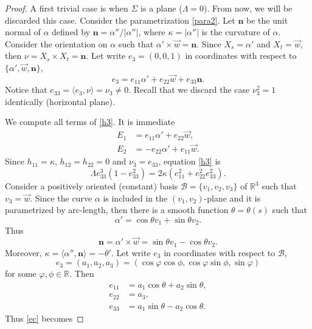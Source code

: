 \documentclass[12pt,a4paper,reqno]{amsart}
\def\r{\mathbb R}
\def\n{\mathbf n}
\begin{document}
\begin{proof}
A first trivial case is when $\Sigma$ is a plane ($\Lambda=0$). From now, we will be discarded this case.   Consider the parametrization \eqref{para2}. Let $\n$ be the unit normal of $\alpha$ defined by $\n=\alpha''/|\alpha''|$, where $\kappa=|\alpha''|$ is the curvature of $\alpha$. Consider the orientation on  $\alpha$ such that $\alpha'\times \vec{w}=\n$. Since $X_s=\alpha'$ and $X_t=\vec{w}$, then $\nu=X_s\times X_t=\n$. Let write $e_3=(0,0,1)$ in coordinates with respect to $\{\alpha',\vec{w},\n\}$, 
$$e_3=e_{11}\alpha'+e_{22} \vec{w}+e_{33}\n.$$
Notice that $e_{33}=\langle e_3,\nu\rangle=\nu_3\not=0$.  
Recall that we discard the case $\nu_3^2= 1$ identically (horizontal plane). 

We compute all terms of \eqref{h3}. It is immediate  
 \begin{equation*}
\begin{split}
E_1&=e_{11}\alpha'+e_{22}\vec{w},\\
E_2&=-e_{22}\alpha'+e_{11}\vec{w}.
\end{split}
\end{equation*}
Since $h_{11}=\kappa$, $h_{12}=h_{22}=0$ and $\nu_3=e_{33}$, equation \eqref{h3} is 
\begin{equation}\label{ec}
\Lambda e_{33}^3(1-e_{33}^2)=2\kappa (e_{11}^2+e_{22}^2e_{33}^2).
\end{equation}
Consider a positively oriented (constant) basis $\mathcal{B}=\{v_1,v_2,v_3\}$ of $\r^3$ such that $v_3=\vec{w}$. Since the curve $\alpha$ is included in the $(v_1,v_2)$-plane and it is parametrized by arc-length, then there is a smooth function $\theta=\theta(s)$ such that 
$$\alpha'=\cos\theta v_1+\sin\theta v_2.$$
Thus 
$$\n=\alpha'\times \vec{w}=\sin\theta v_1-\cos\theta v_2.$$
Moreover, $\kappa=\langle\alpha'',\n\rangle=-\theta'$. Let write $e_3$ in coordinates with respect to $\mathcal{B}$, 
\begin{equation}\label{cij}
e_3=(a_1,a_2,a_3)=(\cos\varphi\cos\phi,\cos\varphi\sin\phi,\sin\varphi)
\end{equation}
for some $\varphi,\phi\in\r$.  Then 
\begin{equation*}
\begin{split}
e_{11}&=a_1\cos\theta+a_2\sin\theta,\\
 e_{22}&=a_3,\\
 e_{33}&=a_1\sin\theta-a_2\cos\theta.
 \end{split}
 \end{equation*}
Thus \eqref{ec} becomes 

\end{proof}
\end{document}
